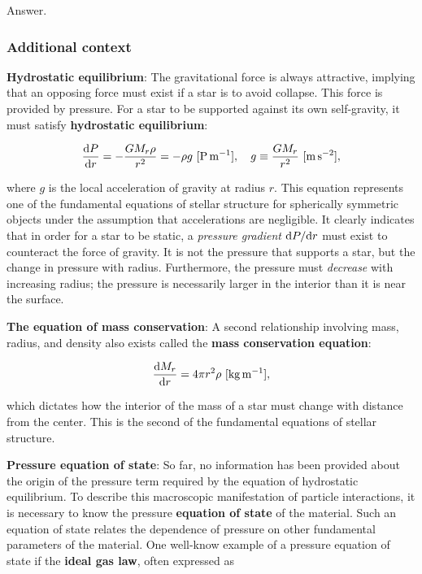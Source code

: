 \documentclass[a4paper,10pt]{article}
\begin{document}
Answer.

\subsubsection{Additional context}

{\noindent}\textbf{Hydrostatic equilibrium}: The gravitational force is always attractive, implying that an opposing force must exist if a star is to avoid collapse. This force is provided by pressure. For a star to be supported against its own self-gravity, it must satisfy \textbf{hydrostatic equilibrium}:

\begin{align*}
    \frac{{\rm d}P}{{\rm d}r} = -\frac{GM_r\rho}{r^2} = -\rho g ~ [{\rm P\,m^{-1}}], ~~~ g \equiv \frac{GM_r}{r^2} ~ [{\rm m\,s^{-2}}],
\end{align*}

{\noindent}where $g$ is the local acceleration of gravity at radius $r$. This equation represents one of the fundamental equations of stellar structure for spherically symmetric objects under the assumption that accelerations are negligible. It clearly indicates that in order for a star to be static, a \textit{pressure gradient} ${\rm d}P/{\rm d}r$ must exist to counteract the force of gravity. It is not the pressure that supports a star, but the change in pressure with radius. Furthermore, the pressure must \textit{decrease} with increasing radius; the pressure is necessarily larger in the interior than it is near the surface.

{\noindent}\textbf{The equation of mass conservation}: A second relationship involving mass, radius, and density also exists called the \textbf{mass conservation equation}: 

\begin{align*}
    \frac{{\rm d}M_r}{{\rm d}r} = 4\pi r^2\rho ~ [{\rm kg\,m^{-1}}],
\end{align*}

{\noindent}which dictates how the interior of the mass of a star must change with distance from the center. This is the second of the fundamental equations of stellar structure. 

{\noindent}\textbf{Pressure equation of state}: So far, no information has been provided about the origin of the pressure term required by the equation of hydrostatic equilibrium. To describe this macroscopic manifestation of particle interactions, it is necessary to know the pressure \textbf{equation of state} of the material. Such an equation of state relates the dependence of pressure on other fundamental parameters of the material. One well-know example of a pressure equation of state if the \textbf{ideal gas law}, often expressed as
\end{document}
